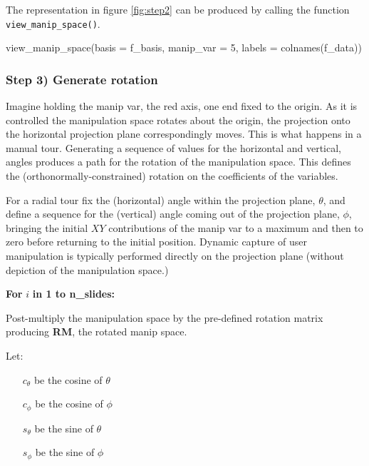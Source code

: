 The representation in figure \ref{fig:step2} can be produced by calling
the function \texttt{view\_manip\_space()}.

\begin{Schunk}
\begin{Sinput}
view_manip_space(basis = f_basis, 
                 manip_var = 5, 
                 labels = colnames(f_data))
\end{Sinput}
\end{Schunk}

\hypertarget{step-3-generate-rotation}{%
\subsubsection{Step 3) Generate
rotation}\label{step-3-generate-rotation}}

Imagine holding the manip var, the red axis, one end fixed to the
origin. As it is controlled the manipulation space rotates about the
origin, the projection onto the horizontal projection plane
correspondingly moves. This is what happens in a manual tour. Generating
a sequence of values for the horizontal and vertical, angles produces a
path for the rotation of the manipulation space. This defines the
(orthonormally-constrained) rotation on the coefficients of the
variables.

For a radial tour fix the (horizontal) angle within the projection
plane, \(\theta\), and define a sequence for the (vertical) angle coming
out of the projection plane, \(\phi\), bringing the initial \(XY\)
contributions of the manip var to a maximum and then to zero before
returning to the initial position. Dynamic capture of user manipulation
is typically performed directly on the projection plane (without
depiction of the manipulation space.)

\textbf{For } \(i\) \textbf{in 1 to n\_slides:}

Post-multiply the manipulation space by the pre-defined rotation matrix
producing \textbf{RM}, the rotated manip space.

Let:

\begin{itemize}
  \item[$c_\theta$] be the cosine of $\theta$
  \item[$c_\phi$]   be the cosine of $\phi$
  \item[$s_\theta$] be the sine of   $\theta$
  \item[$s_\phi$]   be the sine of   $\phi$
\end{itemize}

